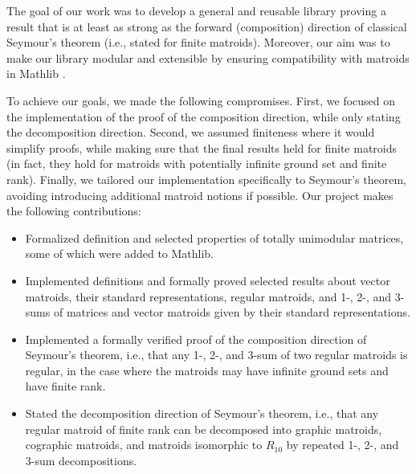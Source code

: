 The goal of our work was to develop a general and reusable library proving a result that is at least as strong as the forward (composition) direction of classical Seymour's theorem (i.e., stated for finite matroids). Moreover, our aim was to make our library modular and extensible by ensuring compatibility with matroids in Mathlib \cite{Mathlib}.
\pagebreak[4] %

To achieve our goals, we made the following compromises. First, we focused on the implementation of the proof of the composition direction, while only stating the decomposition direction. Second, we assumed finiteness where it would simplify proofs, while making sure that the final results held for finite matroids (in fact, they hold for matroids with potentially infinite ground set and finite rank). Finally, we tailored our implementation specifically to Seymour's theorem, avoiding introducing additional matroid notions if possible.
Our project makes the following contributions:
\begin{itemize}
    \item Formalized definition and selected properties of totally unimodular matrices, some of which were added to Mathlib.
    \item Implemented definitions and formally proved selected results about vector matroids, their standard representations, regular matroids, and 1-, 2-, and 3-sums of matrices and vector matroids given by their standard representations.
    \item Implemented a formally verified proof of the composition direction of Seymour's theorem, i.e., that any \hbox{1-,} 2-, and 3-sum of two regular matroids is regular, in the case where the matroids may have infinite ground sets and have finite rank.
    \item Stated the decomposition direction of Seymour's theorem, i.e., that any regular matroid of finite rank can be decomposed into graphic matroids, cographic matroids, and matroids isomorphic to $R_{10}$ by repeated 1-, 2-, and 3-sum decompositions. %
\end{itemize}

